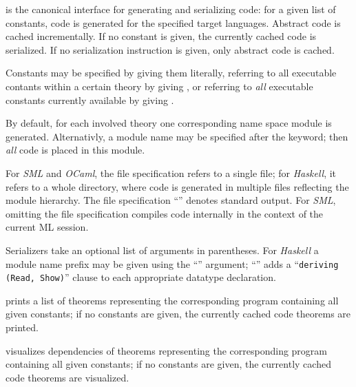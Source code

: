 \begin{isabellebody}
\begin{isamarkuptext}
\begin{description}
  \item \hyperlink{command.HOL.export-code}{\mbox{}} is the canonical interface for
  generating and serializing code: for a given list of constants, code
  is generated for the specified target languages.  Abstract code is
  cached incrementally.  If no constant is given, the currently cached
  code is serialized.  If no serialization instruction is given, only
  abstract code is cached.

  Constants may be specified by giving them literally, referring to
  all executable contants within a certain theory by giving , or referring to \emph{all} executable constants currently
  available by giving \isa{{\isachardoublequote}{\isacharasterisk}{\isachardoublequote}}.

  By default, for each involved theory one corresponding name space
  module is generated.  Alternativly, a module name may be specified
  after the \hyperlink{keyword.module-name}{\mbox{}} keyword; then \emph{all} code is
  placed in this module.

  For \emph{SML} and \emph{OCaml}, the file specification refers to a
  single file; for \emph{Haskell}, it refers to a whole directory,
  where code is generated in multiple files reflecting the module
  hierarchy.  The file specification ``\isa{{\isachardoublequote}{\isacharminus}{\isachardoublequote}}'' denotes standard
  output.  For \emph{SML}, omitting the file specification compiles
  code internally in the context of the current ML session.

  Serializers take an optional list of arguments in parentheses.  For
  \emph{Haskell} a module name prefix may be given using the ``'' argument; ``'' adds a ``\verb|deriving (Read, Show)|'' clause to each appropriate datatype
  declaration.

  \item \hyperlink{command.HOL.code-thms}{\mbox{}} prints a list of theorems
  representing the corresponding program containing all given
  constants; if no constants are given, the currently cached code
  theorems are printed.

  \item \hyperlink{command.HOL.code-deps}{\mbox{}} visualizes dependencies of
  theorems representing the corresponding program containing all given
  constants; if no constants are given, the currently cached code
  theorems are visualized.


\end{description}
\end{isamarkuptext}
\end{isabellebody}

